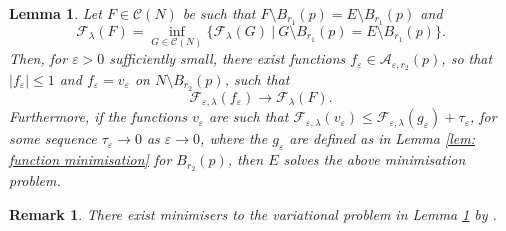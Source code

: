 \documentclass[11pt]{article}
\newtheorem{rem}{Remark}
\newtheorem{lem}{Lemma}
\begin{document}
\begin{lem}\label{lem: recovery functions}
Let $F \in \mathcal{C}(N)$ be such that $F \setminus B_{r_1}(p) = E \setminus B_{r_1}(p)$ and
\begin{equation*}
    \mathcal{F}_\lambda(F) = \inf_{G \in \mathcal{C}(N)} \{ \mathcal{F}_\lambda(G) \: | \: G \setminus B_{r_1}(p) = E \setminus B_{r_1}(p) \}.
\end{equation*}
Then, for $\varepsilon > 0$ sufficiently small, there exist functions $f_\varepsilon \in \mathcal{A}_{\varepsilon,r_2}(p)$, so that $|f_\varepsilon| \leq 1$ and $f_\varepsilon = v_\varepsilon$ on $N \setminus B_{r_2}(p)$, such that 
\begin{equation*}
    \mathcal{F}_{\varepsilon,\lambda}(f_\varepsilon) \rightarrow \mathcal{F}_\lambda(F).
\end{equation*}
Furthermore, if the functions $v_\varepsilon$ are such that $\mathcal{F}_{\varepsilon,\lambda}(v_\varepsilon) \leq \mathcal{F}_{\varepsilon,\lambda}(g_\varepsilon) + \tau_\varepsilon$, for some sequence $\tau_\varepsilon \rightarrow 0$ as $\varepsilon \rightarrow 0$, where the $g_\varepsilon$ are defined as in Lemma \ref{lem: function minimisation} for $B_{r_2}(p)$, then $E$ solves the above minimisation problem.
\end{lem}

\begin{rem}
There exist minimisers to the variational problem in Lemma \ref{lem: recovery functions} by \cite[Section 12.5]{maggi_2012}.
\end{rem}
\end{document}
